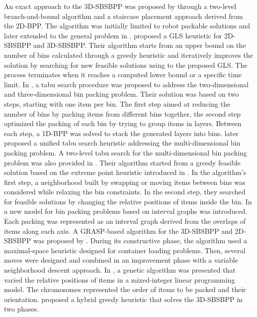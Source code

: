 An exact approach to the 3D-SBSBPP was proposed by \cite{martello2000three} through a two-level branch-and-bound algorithm and a staircase placement approach derived from the 2D-BPP.
The algorithm was initially limited to robot packable solutions and later extended to the general problem in \cite{martello2007exact}.
\cite{faroe2003guided} proposed a GLS heuristic for 2D-SBSBPP and 3D-SBSBPP.
Their algorithm starts from an upper bound on the number of bins calculated through a greedy heuristic and iteratively improves the solution by searching for new feasible solutions using to the proposed GLS.
The process terminates when it reaches a computed lower bound or a specific time limit.
In \cite{lodi2002heuristic}, a tabu search procedure was proposed to address the two-dimensional and three-dimensional bin packing problem.
Their solution was based on two steps, starting with one item per bin.
The first step aimed at reducing the number of bins by packing items from different bins together, the second step optimized the packing of each bin by trying to group items in layers.
Between each step, a 1D-BPP was solved to stack the generated layers into bins.
\cite{Lodi2004} later proposed a unified tabu search heuristic addressing the multi-dimensional bin packing problem.
A two-level tabu search for the multi-dimensional bin packing problem was also provided in \cite{crainic2009ts2pack}.
Their algorithm started from a greedy feasible solution based on the extreme point heuristic introduced in \cite{crainic2008extreme}.
In the algorithm's first step, a neighborhood built by swapping or moving items between bins was considered while relaxing the bin constraints.
In the second step, they searched for feasible solutions by changing the relative positions of items inside the bin.
In \cite{fekete2004combinatorial} a new model for bin packing problems based on interval graphs was introduced.
Each packing was represented as an interval graph derived from the overlaps of items along each axis.
A GRASP-based algorithm for the 3D-SBSBPP and 2D-SBSBPP was proposed by \cite{parreno2010hybrid}. During its constructive phase, the algorithm used a maximal-space heuristic designed for container loading problems.
Then, several moves were designed and combined in an improvement phase with a variable neighborhood descent approach.
In \cite{WU2010347}, a genetic algorithm was presented that varied the relative positions of items in a mixed-integer linear programming model. The chromosomes represented the order of items to be packed and their orientation.
\cite{hifi2014hybrid} proposed a hybrid greedy heuristic that solves the 3D-SBSBPP in two phases.
